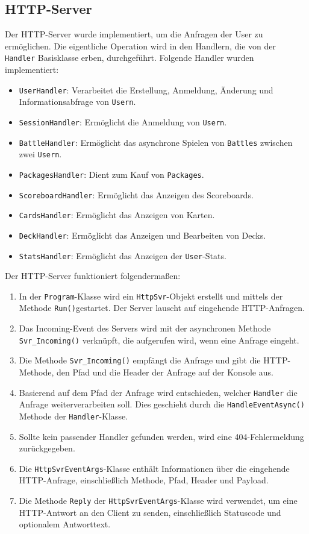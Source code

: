 \documentclass[a4paper, 12pt]{article}
\begin{document}
\subsection{HTTP-Server}
Der HTTP-Server wurde implementiert, um die Anfragen der User zu ermöglichen. Die eigentliche Operation wird in den Handlern, die von der \texttt{Handler} Basisklasse erben, durchgeführt. Folgende Handler wurden implementiert:
\begin{itemize}
    \item \texttt{UserHandler}: Verarbeitet die Erstellung, Anmeldung, Änderung und Informationsabfrage von \texttt{Usern}.
    \item \texttt{SessionHandler}: Ermöglicht die Anmeldung von \texttt{Usern}.
    \item \texttt{BattleHandler}: Ermöglicht das asynchrone Spielen von \texttt{Battles} zwischen zwei \texttt{Usern}.
    \item \texttt{PackagesHandler}: Dient zum Kauf von \texttt{Packages}.
    \item \texttt{ScoreboardHandler}: Ermöglicht das Anzeigen des Scoreboards.
    \item \texttt{CardsHandler}: Ermöglicht das Anzeigen von Karten.
    \item \texttt{DeckHandler}: Ermöglicht das Anzeigen und Bearbeiten von Decks.
    \item \texttt{StatsHandler}: Ermöglicht das Anzeigen der \texttt{User}-Stats.
\end{itemize}

Der HTTP-Server funktioniert folgendermaßen:
\begin{enumerate}
    \item In der \texttt{Program}-Klasse wird ein \texttt{HttpSvr}-Objekt erstellt und mittels der Methode \texttt{Run()}gestartet. Der Server lauscht auf eingehende HTTP-Anfragen.
    \item Das Incoming-Event des Servers wird mit der asynchronen Methode \texttt{Svr\_Incoming()} verknüpft, die aufgerufen wird, wenn eine Anfrage eingeht.
    \item Die Methode \texttt{Svr\_Incoming()} empfängt die Anfrage und gibt die HTTP-Methode, den Pfad und die Header der Anfrage auf der Konsole aus.
    \item Basierend auf dem Pfad der Anfrage wird entschieden, welcher \texttt{Handler} die Anfrage weiterverarbeiten soll. Dies geschieht durch die \texttt{HandleEventAsync()} Methode der \texttt{Handler}-Klasse.
    \item Sollte kein passender Handler gefunden werden, wird eine 404-Fehlermeldung zurückgegeben.
    \item Die \texttt{HttpSvrEventArgs}-Klasse enthält Informationen über die eingehende HTTP-Anfrage, einschließlich Methode, Pfad, Header und Payload.
    \item Die Methode \texttt{Reply} der \texttt{HttpSvrEventArgs}-Klasse wird verwendet, um eine HTTP-Antwort an den Client zu senden, einschließlich Statuscode und optionalem Antworttext.
\end{enumerate}
\end{document}
